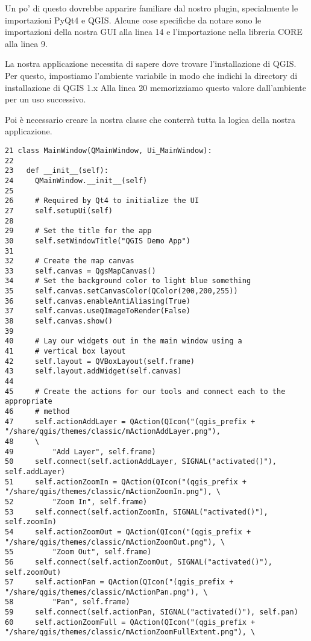Un po' di questo dovrebbe apparire familiare dal nostro plugin, specialmente le importazioni PyQt4 e
QGIS. Alcune cose specifiche da notare sono le importazioni della nostra GUI alla linea
14 e l'importazione nella libreria CORE alla linea 9.

La nostra applicazione necessita di sapere dove trovare l'installazione di QGIS. Per questo, impostiamo l'ambiente variabile  in modo che indichi la directory di installazione di QGIS 1.x Alla linea 20 memorizziamo questo valore dall'ambiente per un uso successivo.

Poi è necessario creare la nostra classe  che conterrà tutta la logica della nostra applicazione.
\begin{verbatim}
21 class MainWindow(QMainWindow, Ui_MainWindow):
22 
23   def __init__(self):
24     QMainWindow.__init__(self)
25 
26     # Required by Qt4 to initialize the UI
27     self.setupUi(self)
28 
29     # Set the title for the app
30     self.setWindowTitle("QGIS Demo App")
31 
32     # Create the map canvas
33     self.canvas = QgsMapCanvas()
34     # Set the background color to light blue something
35     self.canvas.setCanvasColor(QColor(200,200,255))
36     self.canvas.enableAntiAliasing(True)
37     self.canvas.useQImageToRender(False)
38     self.canvas.show()
39 
40     # Lay our widgets out in the main window using a 
41     # vertical box layout
42     self.layout = QVBoxLayout(self.frame)
43     self.layout.addWidget(self.canvas)
44 
45     # Create the actions for our tools and connect each to the appropriate
46     # method
47     self.actionAddLayer = QAction(QIcon("(qgis_prefix + "/share/qgis/themes/classic/mActionAddLayer.png"),
48     \
49         "Add Layer", self.frame)
50     self.connect(self.actionAddLayer, SIGNAL("activated()"), self.addLayer)
51     self.actionZoomIn = QAction(QIcon("(qgis_prefix + "/share/qgis/themes/classic/mActionZoomIn.png"), \
52         "Zoom In", self.frame)
53     self.connect(self.actionZoomIn, SIGNAL("activated()"), self.zoomIn)
54     self.actionZoomOut = QAction(QIcon("(qgis_prefix + "/share/qgis/themes/classic/mActionZoomOut.png"), \
55         "Zoom Out", self.frame)
56     self.connect(self.actionZoomOut, SIGNAL("activated()"), self.zoomOut)
57     self.actionPan = QAction(QIcon("(qgis_prefix + "/share/qgis/themes/classic/mActionPan.png"), \
58         "Pan", self.frame)
59     self.connect(self.actionPan, SIGNAL("activated()"), self.pan)
60     self.actionZoomFull = QAction(QIcon("(qgis_prefix + "/share/qgis/themes/classic/mActionZoomFullExtent.png"), \

\end{verbatim}
